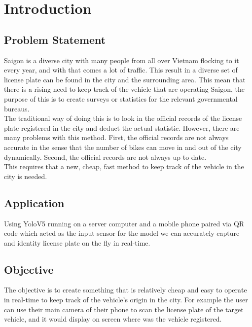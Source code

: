 \chapter{\centering Introduction}


\section{Problem Statement}
Saigon is a diverse city with many people from all over Vietnam flocking to it
every year, and with that comes a lot of traffic. This result in a diverse set
of license plate can be found in the city and the surrounding area. This mean that
there is a rising need to keep track of the vehicle that are operating Saigon, 
the purpose of this is to create surveys or statistics for the relevant governmental 
bureaus. \\

The traditional way of doing this is to look in the official records of the 
license plate registered in the city and deduct the actual statistic. However, 
there are many problems with this method. First, the official records are not always 
accurate in the sense that the number of bikes can move in and out of the city 
dynamically. Second, the official records are not always up to date. \\

This requires that a new, cheap, fast method to keep track of the vehicle in the city 
is needed. 

\section{Application}
Using YoloV5 running on a server computer and a mobile phone paired via QR code 
which acted as the input sensor for the model we can accurately capture and identity 
license plate on the fly in real-time.

\section{Objective}
The objective is to create something that is relatively cheap and easy to operate 
in real-time to keep track of the vehicle's origin in the city. For example the 
user can use their main camera of their phone to scan the license plate of the target 
vehicle, and it would display on screen where was the vehicle registered.



